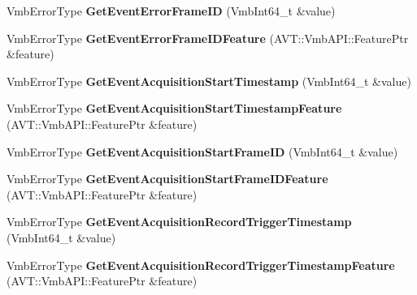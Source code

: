 \begin{DoxyCompactItemize}
\item 
\hypertarget{classMakoCamera_a074a839c07fbc1aad772cbbab864c50e}{Vmb\-Error\-Type {\bfseries Get\-Event\-Error\-Frame\-I\-D} (Vmb\-Int64\-\_\-t \&value)}\label{classMakoCamera_a074a839c07fbc1aad772cbbab864c50e}

\item 
\hypertarget{classMakoCamera_afbb3b3c9a35b67f61a2f43f823d88052}{Vmb\-Error\-Type {\bfseries Get\-Event\-Error\-Frame\-I\-D\-Feature} (A\-V\-T\-::\-Vmb\-A\-P\-I\-::\-Feature\-Ptr \&feature)}\label{classMakoCamera_afbb3b3c9a35b67f61a2f43f823d88052}

\item 
\hypertarget{classMakoCamera_a3c22eac9f05c06fed5021950ac7df14a}{Vmb\-Error\-Type {\bfseries Get\-Event\-Acquisition\-Start\-Timestamp} (Vmb\-Int64\-\_\-t \&value)}\label{classMakoCamera_a3c22eac9f05c06fed5021950ac7df14a}

\item 
\hypertarget{classMakoCamera_a8960f96ad4f12223a01976221fbd4d9f}{Vmb\-Error\-Type {\bfseries Get\-Event\-Acquisition\-Start\-Timestamp\-Feature} (A\-V\-T\-::\-Vmb\-A\-P\-I\-::\-Feature\-Ptr \&feature)}\label{classMakoCamera_a8960f96ad4f12223a01976221fbd4d9f}

\item 
\hypertarget{classMakoCamera_a49f0921d05f53a37743293d5fea76071}{Vmb\-Error\-Type {\bfseries Get\-Event\-Acquisition\-Start\-Frame\-I\-D} (Vmb\-Int64\-\_\-t \&value)}\label{classMakoCamera_a49f0921d05f53a37743293d5fea76071}

\item 
\hypertarget{classMakoCamera_aeb8025ec7bfd744f133daa91cc52a761}{Vmb\-Error\-Type {\bfseries Get\-Event\-Acquisition\-Start\-Frame\-I\-D\-Feature} (A\-V\-T\-::\-Vmb\-A\-P\-I\-::\-Feature\-Ptr \&feature)}\label{classMakoCamera_aeb8025ec7bfd744f133daa91cc52a761}

\item 
\hypertarget{classMakoCamera_ad1eb743c424009f951daa867fe78c112}{Vmb\-Error\-Type {\bfseries Get\-Event\-Acquisition\-Record\-Trigger\-Timestamp} (Vmb\-Int64\-\_\-t \&value)}\label{classMakoCamera_ad1eb743c424009f951daa867fe78c112}

\item 
\hypertarget{classMakoCamera_a5dc8cb83826310bbc01b27b4672d42ea}{Vmb\-Error\-Type {\bfseries Get\-Event\-Acquisition\-Record\-Trigger\-Timestamp\-Feature} (A\-V\-T\-::\-Vmb\-A\-P\-I\-::\-Feature\-Ptr \&feature)}\label{classMakoCamera_a5dc8cb83826310bbc01b27b4672d42ea}


\end{DoxyCompactItemize}
